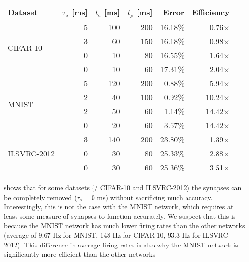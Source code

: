 \begin{table}
  \centering
  \begin{tabular}{lrrrrr}
    Dataset & $\tau_s$ [ms] & $t_c$ [ms] & $t_p$ [ms] & Error & Efficiency \\
    \hline\multirow{4}{*}{CIFAR-10}
      & 5 & 100 & 200 & 16.18\% & 0.76$\times$ \\
      & 3 &  60 & 150 & 16.18\% & 0.98$\times$ \\
      & 0 &  10 &  80 & 16.55\% & 1.64$\times$ \\
      & 0 &  10 &  60 & 17.31\% & 2.04$\times$ \\
    \hline\multirow{4}{*}{MNIST}
      & 5 & 120 & 200 & 0.88\% & 5.94$\times$ \\
      & 2 &  40 & 100 & 0.92\% & 10.24$\times$ \\
      & 2 &  50 &  60 & 1.14\% & 14.42$\times$ \\
      & 0 &  20 &  60 & 3.67\% & 14.42$\times$ \\
    \hline\multirow{3}{*}{ILSVRC-2012}
      & 3 & 140 & 200 & 23.80\% & 1.39$\times$ \\
      & 0 &  30 &  80 & 25.33\% & 2.88$\times$ \\
      & 0 &  30 &  60 & 25.36\% & 3.51$\times$ \\
  \end{tabular}
\end{table}

 shows that for some datasets
(\ie/ CIFAR-10 and ILSVRC-2012)
the synapses can be completely removed ($\tau_s = 0$ ms)
without sacrificing much accuracy.
Interestingly, this is not the case with the MNIST network,
which requires at least some measure of synapses to function accurately.
We suspect that this is because the MNIST network has much lower firing rates
than the other networks
(average of 9.67 Hz for MNIST, 148 Hz for CIFAR-10, 93.3 Hz for ILSVRC-2012).
This difference in average firing rates is also why the MNIST network is
significantly more efficient than the other networks.

